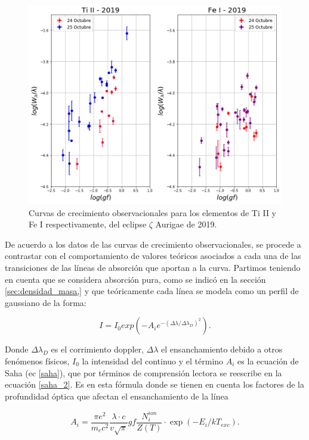 \documentclass[12pt,oneside,openany,letter]{book}
\begin{document}
\begin{figure}[h]
    \centering
    \includegraphics[width=1\linewidth]{Gaficas/GoC_obs.png}
    \caption{Curvas de crecimiento observacionales para los elementos de Ti II y Fe I respectivamente, del eclipse $\zeta$ Aurigae de 2019.}
    \label{fig:GoC_obs}
\end{figure}



\noindent De acuerdo a los datos de las curvas de crecimiento observacionales, se procede a contrastar con el comportamiento de valores teóricos asociados a cada una de las transiciones de las líneas de absorción que aportan a la curva. Partimos teniendo en cuenta que se considera absorción pura, como se indicó en la sección \ref{sec:densidad_masa,} y que teóricamente cada línea se modela como un perfil de gaussiano de la forma:

\begin{equation*}
    I = I_0 exp\left(-A_ie^{-(\Delta\lambda/\Delta\lambda_D)^2}\right).
\end{equation*}

Donde $\Delta\lambda_D$ es el corrimiento doppler, $\Delta\lambda$ el ensanchamiento debido a otros fenómenos físicos, $I_0$ la intensidad del continuo y el término $A_i$ es la ecuación de Saha (ec \ref{saha}), que por términos de comprensión lectora se reescribe en la ecuación \ref{saha_2}. Es en esta fórmula donde se tienen en cuenta los factores de la profundidad óptica que afectan el ensanchamiento de la línea

\begin{equation}
    A_{i}=\frac{\pi e^{2}}{m_{e} c^{2}} \frac{\lambda \cdot c}{v \sqrt{\pi}} g f \frac{N_{i}^{i o n}}{Z(T)} \cdot \exp \left(-E_{i} / k T_{exc}\right).
    \label{saha_2}
\end{equation}
\end{document}

